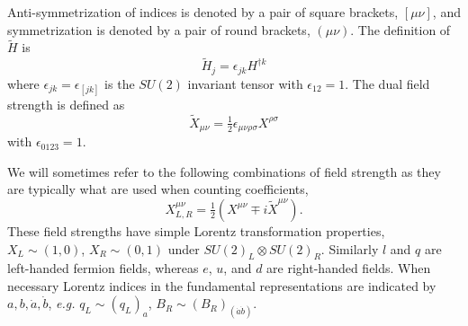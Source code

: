 Anti-symmetrization of indices is denoted by a pair of square brackets, $[\mu\nu]$, and symmetrization is denoted by a pair of round brackets, $(\mu\nu)$.
The definition of $\widetilde H$ is
\begin{equation}
\widetilde H_j = \epsilon_{jk} H^{\dag k}
\end{equation}
where $\epsilon_{jk} = \epsilon_{[jk]}$ is the $SU(2)$ invariant tensor with $\epsilon_{12} = 1$.
The dual field strength is defined as
\begin{equation}
\widetilde X_{\mu\nu} = \tfrac{1}{2} \epsilon_{\mu\nu\rho\sigma} X^{\rho\sigma}
\end{equation}
with $\epsilon_{0123} = 1$. 

We will sometimes refer to the following combinations of field strength as they are typically what are used when counting coefficients,
\begin{equation}
X_{L,R}^{\mu\nu} = \tfrac{1}{2} (X^{\mu\nu} \mp i \widetilde X^{\mu\nu}) .
\end{equation}
These field strengths have simple Lorentz transformation properties, $X_L \sim (1, 0)$, $X_R \sim (0, 1)$ under $SU(2)_L \otimes SU(2)_R$.
Similarly $l$ and $q$ are left-handed fermion fields, whereas $e$, $u$, and $d$ are right-handed fields.
When necessary Lorentz indices in the fundamental representations are indicated by $a, b, \dot a, \dot b$, \textit{e.g.} $q_L \sim (q_L)_a$, $B_R \sim (B_R)_{(\dot a \dot b)}$.

